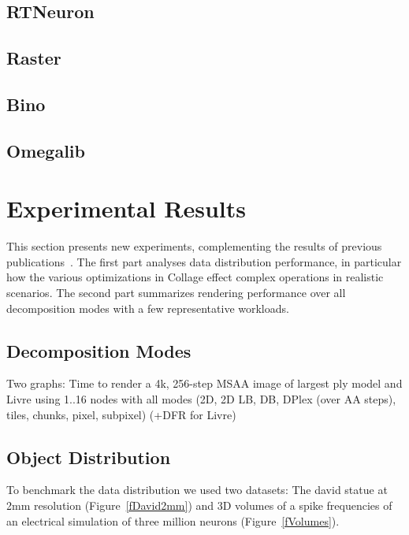 \documentclass[10pt,journal,compsoc]{IEEEtran}
\newcommand{\fig}[1]{Figure~\ref{#1}}
\begin{document}
\subsection{RTNeuron}
\cite{HBBES:13}

\subsection{Raster}

\subsection{Bino}

\subsection{Omegalib}

\section{Experimental Results}\label{sec:results}

This section presents new experiments, complementing the results of previous
publications~\cite{EP:07, EMP:09, MEP:10, EEP:11, EBAHMP:12, HBBES:13, deflect,
  SPEP:16}. The first part analyses data distribution performance, in particular
how the various optimizations in Collage effect complex operations in realistic
scenarios. The second part summarizes rendering performance over all
decomposition modes with a few representative workloads.

\subsection{Decomposition Modes}

Two graphs: Time to render a 4k, 256-step MSAA image of largest ply model and
Livre using 1..16 nodes with all modes (2D, 2D LB, DB, DPlex (over AA steps),
tiles, chunks, pixel, subpixel) (+DFR for Livre)

\subsection{Object Distribution}

To benchmark the data distribution we used two datasets: The david statue at 2mm
resolution (\fig{fDavid2mm}) and 3D volumes of a spike frequencies of an
electrical simulation of three million neurons (\fig{fVolumes}).
\end{document}

